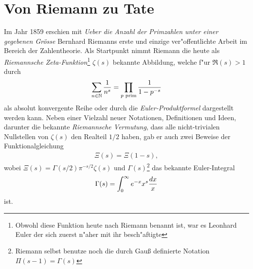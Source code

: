 
\section{Von Riemann zu Tate}
	Im Jahr 1859 erschien mit \emph{\glqq Ueber die Anzahl der Primzahlen unter einer gegebenen Grösse\grqq} \cite{riemann1859ueber} Bernhard Riemanns erste und einzige ver"offentlichte Arbeit im Bereich der Zahlentheorie.
	Als Startpunkt nimmt Riemann die heute als \emph{Riemannsche Zeta-Funktion}\footnote{Obwohl diese Funktion heute nach Riemann benannt ist, war es Leonhard Euler der sich zuerst n"aher mit ihr besch"aftigte } $\zeta(s)$ bekannte Abbildung, welche f"ur $\Re(s)>1$ durch
	\begin{align*}
		\sum_{n\in \mathbb{N}} \frac{1}{n^s} = \prod_{p \text{ prim}} \frac{1}{1-p^{-s}}
	\end{align*}
	als absolut konvergente Reihe oder durch die \emph{Euler-Produktformel} dargestellt werden kann.
	Neben einer Vielzahl neuer Notationen, Definitionen und Ideen, darunter die bekannte \emph{Riemannsche Vermutung}, dass alle nicht-trivialen Nullstellen von $\zeta(s)$ den Realteil $1/2$ haben, gab er auch zwei Beweise der Funktionalgleichung
	\begin{align*}
		\Xi(s) = \Xi(1-s),
	\end{align*}
	wobei $\Xi(s) = \Gamma(s/2)\pi^{-s/2}\zeta(s)$ und $\Gamma(s)$\footnote{Riemann selbst benutze noch die durch Gauß definierte Notation $\Pi(s-1)=\Gamma(s)$} das bekannte Euler-Integral
	\begin{align*}
		\Gamma(s) = \int_0^\infty e^{-x} x^s \frac{d{x}}{x}
	\end{align*}
	ist.
	
